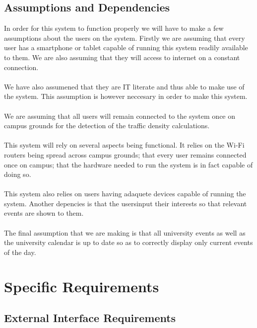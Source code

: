 \documentclass{article}
\begin{document}
	\subsection{Assumptions and Dependencies}
	In order for this system to function properly we will have to make a few assumptions about the users on the system.
	Firstly we are assuming that every user has a smartphone or tablet capable of running this system readily available to them.
	We are also assuming that they will access to internet on a constant connection.\\\\
	We have also assumened that they are IT literate and thus able to make use of the system. This assumption is however
	neccesary in order to make this system.\\\\We are assuming that all users will remain connected to the system once on campus 		grounds for the detection of the traffic density calculations.\\\\
	This system will rely on several aspects being functional. It relies on the Wi-Fi routers being spread across campus
	grounds; that every user remains connected once on campus; that the hardware needed to run the system is in fact capable
	of doing so.\\\\This system also relies on users having adaquete devices capable of running the system. Another depencies is 		that the usersinput their interests so that relevant events are shown to them. \\\\
	The final assumption that we are making is that all university events as well as the university calendar is up to date so as to 
	correctly display only current events of the day.
\section{Specific Requirements}
	\subsection{External Interface Requirements}
\end{document}
